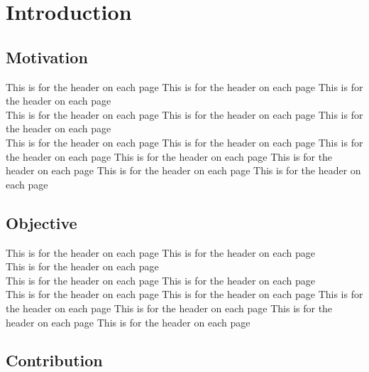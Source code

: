 
\chapter{Introduction} %

\label{Chapter1} %




\section{Motivation}
This is for the header on each page
This is for the header on each page
This is for the header on each page\\
This is for the header on each page
This is for the header on each page
This is for the header on each page\\
This is for the header on each page
This is for the header on each page
This is for the header on each page
This is for the header on each page
This is for the header on each page
This is for the header on each page
This is for the header on each page


\section{ Objective }

This is for the header on each page
This is for the header on each page\\
This is for the header on each page\\
This is for the header on each page
This is for the header on each page\\
This is for the header on each page
This is for the header on each page
This is for the header on each page
This is for the header on each page
This is for the header on each page
This is for the header on each page


\section{Contribution}

